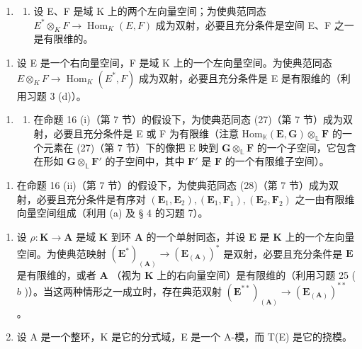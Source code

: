 \begin{enumerate}
\def\labelenumi{\arabic{enumi}.}
\setcounter{enumi}{25}
\tightlist
\item
  \begin{enumerate}
  \def\labelenumii{(\alph{enumii})}
  \tightlist
  \item
    设 E、F 是域 K 上的两个左向量空间；为使典范同态 \(E^{*} \otimes_{K} F \to \operatorname{Hom}_{K}(E, F)\) 成为双射，必要且充分条件是空间 E、F 之一是有限维的。
  \end{enumerate}
\end{enumerate}

\begin{enumerate}
\def\labelenumi{(\alph{enumi})}
\setcounter{enumi}{1}
\tightlist
\item
  设 E 是一个右向量空间，F 是域 K 上的一个左向量空间。为使典范同态 \(E \otimes_{K} F \to \operatorname{Hom}_{K}(E^{*}, F)\) 成为双射，必要且充分条件是 E 是有限维的（利用习题 3 (d)）。
\end{enumerate}

\begin{enumerate}
\def\labelenumi{\arabic{enumi}.}
\setcounter{enumi}{26}
\tightlist
\item
  \begin{enumerate}
  \def\labelenumii{(\alph{enumii})}
  \tightlist
  \item
    在命题 16 (i)（第 7 节）的假设下，为使典范同态 (27)（第 7 节）成为双射，必要且充分条件是 E 或 F 为有限维（注意 \(\mathrm{Hom}_{\mathbb{K}}(\mathbf{E},\mathbf{G})\otimes_{\mathbb{L}}\mathbf{F}\) 的一个元素在 (27)（第 7 节）下的像把 E 映到 \(\mathbf{G}\otimes_{\mathbb{L}}\mathbf{F}\) 的一个子空间，它包含在形如 \(\mathbf{G}\otimes_{\mathbb{L}}\mathbf{F}'\) 的子空间中，其中 \(\mathbf{F}'\) 是 \(\mathbf{F}\) 的一个有限维子空间）。
  \end{enumerate}
\end{enumerate}

\begin{enumerate}
\def\labelenumi{(\alph{enumi})}
\setcounter{enumi}{1}
\tightlist
\item
  在命题 16 (ii)（第 7 节）的假设下，为使典范同态 (28)（第 7 节）成为双射，必要且充分条件是有序对 \((\mathbf{E}_1, \mathbf{E}_2), (\mathbf{E}_1, \mathbf{F}_1), (\mathbf{E}_2, \mathbf{F}_2)\) 之一由有限维向量空间组成（利用 (a) 及 § 4 的习题 7）。
\end{enumerate}

\begin{enumerate}
\def\labelenumi{\arabic{enumi}.}
\setcounter{enumi}{27}
\item
  设 \(\rho: \mathbf{K} \to \mathbf{A}\) 是域 \(\mathbf{K}\) 到环 \(\mathbf{A}\) 的一个单射同态，并设 \(\mathbf{E}\) 是 \(\mathbf{K}\) 上的一个左向量空间。为使典范映射 \((\mathbf{E}^*)_{(\mathbf{A})} \to (\mathbf{E}_{(\mathbf{A})})^*\) 是双射，必要且充分条件是 \(\mathbf{E}\) 是有限维的，或者 \(\mathbf{A}\) （视为 \(\mathbf{K}\) 上的右向量空间）是有限维的（利用习题 25 ( \(b\) )）。当这两种情形之一成立时，存在典范双射 \((\mathbf{E}^{**})_{(\mathbf{A})} \to (\mathbf{E}_{(\mathbf{A})})^{**}\) 。
\item
  设 A 是一个整环，K 是它的分式域，E 是一个 A-模，而 T(E) 是它的挠模。
\end{enumerate}

